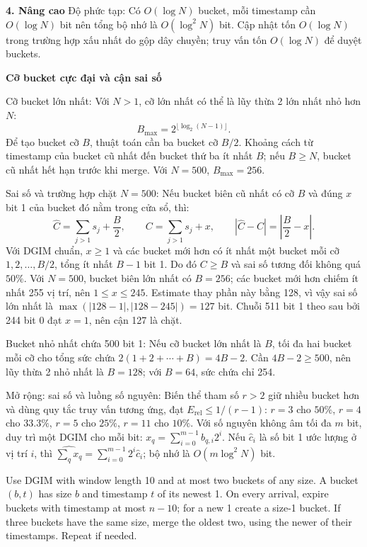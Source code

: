 \documentclass[10pt,a4paper,twocolumn]{article}
\newcommand{\key}[1]{#1:\enspace}
\newcommand{\advancedheading}[1]{%
  \par\addvspace{4pt}\noindent\textbf{#1}\par\nobreak\addvspace{1pt}}
\newcommand{\unitheading}[2]{%
  \par\addvspace{1pt}\noindent\textbf{#1. #2}\enspace}
\newcommand{\unitadvanced}{\unitheading{4}{Nâng cao}}
\begin{document}
\unitadvanced
\key{Độ phức tạp} Có $O(\log N)$ bucket, mỗi timestamp cần $O(\log N)$ bit nên tổng bộ nhớ là $O(\log^2N)$ bit. Cập nhật tốn $O(\log N)$ trong trường hợp xấu nhất do gộp dây chuyền; truy vấn tốn $O(\log N)$ để duyệt buckets.

\advancedheading{Cỡ bucket cực đại và cận sai số}

\key{Cỡ bucket lớn nhất} Với $N>1$, cỡ lớn nhất có thể là lũy thừa 2 lớn nhất nhỏ hơn $N$:
\[
B_{\max}=2^{\lfloor\log_2(N-1)\rfloor}.
\]
Để tạo bucket cỡ $B$, thuật toán cần ba bucket cỡ $B/2$. Khoảng cách từ timestamp của bucket cũ nhất đến bucket thứ ba ít nhất $B$; nếu $B\ge N$, bucket cũ nhất hết hạn trước khi merge. Với $N=500$, $B_{\max}=256$.

\key{Sai số và trường hợp chặt $N=500$} Nếu bucket biên cũ nhất có cỡ $B$ và đúng $x$ bit 1 của bucket đó nằm trong cửa sổ, thì:
\[
\widehat C=\sum_{j>1}s_j+\frac B2,
\qquad C=\sum_{j>1}s_j+x,
\qquad |\widehat C-C|=\left|\frac B2-x\right|.
\]
Với DGIM chuẩn, $x\ge1$ và các bucket mới hơn có ít nhất một bucket mỗi cỡ $1,2,\ldots,B/2$, tổng ít nhất $B-1$ bit 1. Do đó $C\ge B$ và sai số tương đối không quá $50\%$. Với $N=500$, bucket biên lớn nhất có $B=256$; các bucket mới hơn chiếm ít nhất 255 vị trí, nên $1\le x\le245$. Estimate thay phần này bằng 128, vì vậy sai số lớn nhất là $\max(|128-1|,|128-245|)=127$ bit. Chuỗi 511 bit 1 theo sau bởi 244 bit 0 đạt $x=1$, nên cận 127 là chặt.

\key{Bucket nhỏ nhất chứa 500 bit 1} Nếu cỡ bucket lớn nhất là $B$, tối đa hai bucket mỗi cỡ cho tổng sức chứa $2(1+2+\cdots+B)=4B-2$. Cần $4B-2\ge500$, nên lũy thừa 2 nhỏ nhất là $B=128$; với $B=64$, sức chứa chỉ 254.

\key{Mở rộng: sai số và luồng số nguyên} Biến thể tham số $r>2$ giữ nhiều bucket hơn và dùng quy tắc truy vấn tương ứng, đạt $E_{\mathrm{rel}}\le1/(r-1)$: $r=3$ cho $50\%$, $r=4$ cho $33.3\%$, $r=5$ cho $25\%$, $r=11$ cho $10\%$. Với số nguyên không âm tối đa $m$ bit, duy trì một DGIM cho mỗi bit: $x_q=\sum_{i=0}^{m-1}b_{q,i}2^i$. Nếu $\hat c_i$ là số bit 1 ước lượng ở vị trí $i$, thì $\widehat{\sum_qx_q}=\sum_{i=0}^{m-1}2^i\hat c_i$; bộ nhớ là $O(m\log^2N)$ bit.


Use DGIM with window length 10 and at most two buckets of any size. A bucket $(b,t)$ has size $b$ and timestamp $t$ of its newest 1. On every arrival, expire buckets with timestamp at most $n-10$; for a new 1 create a size-1 bucket. If three buckets have the same size, merge the oldest two, using the newer of their timestamps. Repeat if needed.
\end{document}
